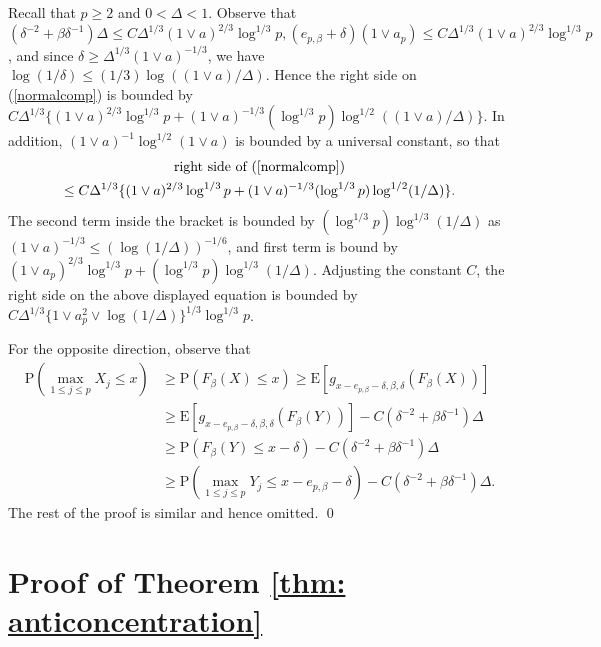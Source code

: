 \documentclass[11pt,reqno]{amsart}
\theoremstyle{definition}
\newcommand{\Ep}{{\mathrm{E}}}
\renewcommand{\Pr}{{\mathrm{P}}}
\begin{document}
Recall that $p \geq 2$ and $0 < \Delta < 1$. Observe that $(\delta^{-2}+\beta \delta^{-1})\Delta \leq C \Delta^{1/3} (1 \vee a)^{2/3} \log^{1/3} p, (e_{p,\beta}+\delta) (1 \vee a_{p}) \leq C \Delta^{1/3} (1 \vee a)^{2/3} \log^{1/3} p$, and since $\delta \geq \Delta^{1/3} (1 \vee a)^{-1/3}$, we have  $\log (1/\delta) \leq (1/3) \log ((1 \vee a)/\Delta)$. Hence the right side on (\ref{normalcomp}) is bounded by $C \Delta^{1/3} \{ (1 \vee a)^{2/3} \log^{1/3} p + (1 \vee a)^{-1/3} ( \log^{1/3} p ) \log^{1/2}((1 \vee a)/\Delta) \}$. In addition, $(1 \vee a)^{-1} \log^{1/2} (1 \vee a)$ is bounded by a universal constant, so that
\begin{multline*}
\text{right side of (\ref{normalcomp})} \\
\leq C \Delta^{1/3} \{ (1 \vee a)^{2/3} \log^{1/3} p + (1 \vee a)^{-1/3} ( \log^{1/3} p ) \log^{1/2}(1/\Delta) \}.
\end{multline*}
The second term inside the bracket is bounded by $( \log^{1/3} p ) \log^{1/3}(1/\Delta)$ as $(1 \vee a)^{-1/3} \leq (\log (1/\Delta))^{-1/6}$,
and first term is bound by $(1 \vee a_{p})^{2/3} \log^{1/3} p + ( \log^{1/3} p ) \log^{1/3}(1/\Delta)$. Adjusting the constant $C$, the right side on the above displayed equation is bounded by $C \Delta^{1/3} \{ 1 \vee a_{p}^{2} \vee \log(1/\Delta) \}^{1/3} \log^{1/3}p$.

For the opposite direction, observe that
\begin{align*}
\Pr ( \max_{1 \leq j \leq p} X_{j}   \leq x )
&\geq \Pr ( F_{\beta} (X) \leq x) \geq \Ep[g_{x-e_{p,\beta}-\delta,\beta,\delta}(F_\beta(X))] \\
&\geq \Ep[g_{x-e_{p,\beta}-\delta,\beta,\delta}(F_\beta(Y))] - C(\delta^{-2}+\beta \delta^{-1})\Delta \\
&\geq \Pr (F_{\beta}(Y) \leq x - \delta ) - C(\delta^{-2}+\beta \delta^{-1})\Delta \\
&\geq \Pr (\max_{1 \leq j \leq p} Y_{j} \leq x - e_{p,\beta} -  \delta ) - C(\delta^{-2}+\beta \delta^{-1})\Delta.
\end{align*}
The rest of the proof is similar and hence omitted.
\qed


\section{Proof of Theorem \ref{thm: anticoncentration}}
\label{sec: proof for section 3}
\end{document}
